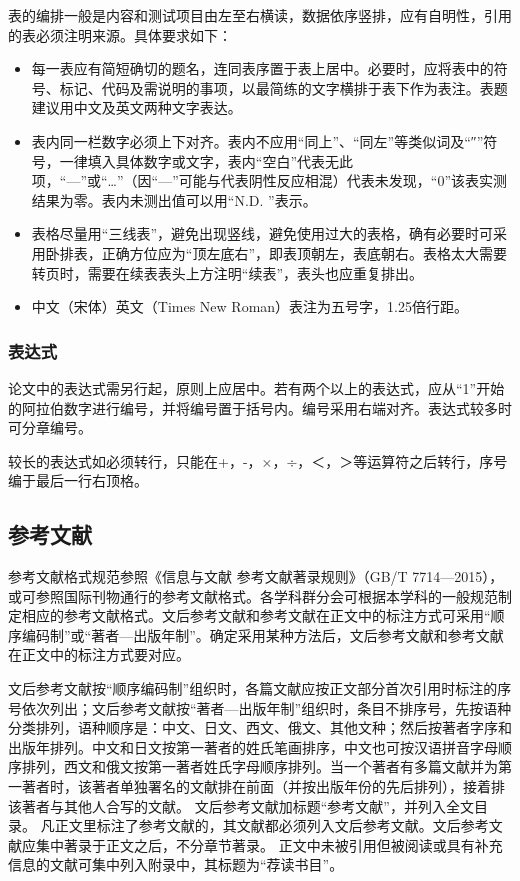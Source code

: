 {表的编排一般是内容和测试项目由左至右横读，数据依序竖排，应有自明性，引用的表必须注明来源。具体要求如下：
\begin{itemize}
    \item 每一表应有简短确切的题名，连同表序置于表上居中。必要时，应将表中的符号、标记、代码及需说明的事项，以最简练的文字横排于表下作为表注。表题建议用中文及英文两种文字表达。
    \item 表内同一栏数字必须上下对齐。表内不应用“同上”、“同左”等类似词及“″”符号，一律填入具体数字或文字，表内“空白”代表无此项，“—”或“…”（因“—”可能与代表阴性反应相混）代表未发现，“0”该表实测结果为零。表内未测出值可以用“N.D. ”表示。
    \item 表格尽量用“三线表”，避免出现竖线，避免使用过大的表格，确有必要时可采用卧排表，正确方位应为“顶左底右”，即表顶朝左，表底朝右。表格太大需要转页时，需要在续表表头上方注明“续表”，表头也应重复排出。
    \item 中文（宋体）英文（Times New Roman）表注为五号字，1.25倍行距。
\end{itemize}

\subsubsection{表达式}
论文中的表达式需另行起，原则上应居中。若有两个以上的表达式，应从“1”开始的阿拉伯数字进行编号，并将编号置于括号内。编号采用右端对齐。表达式较多时可分章编号。

较长的表达式如必须转行，只能在+，-，×，÷，＜，＞等运算符之后转行，序号编于最后一行右顶格。

\subsection{参考文献}
参考文献格式规范参照《信息与文献 参考文献著录规则》（GB/T 7714—2015），或可参照国际刊物通行的参考文献格式。各学科群分会可根据本学科的一般规范制定相应的参考文献格式。文后参考文献和参考文献在正文中的标注方式可采用“顺序编码制”或“著者—出版年制”。确定采用某种方法后，文后参考文献和参考文献在正文中的标注方式要对应。

文后参考文献按“顺序编码制”组织时，各篇文献应按正文部分首次引用时标注的序号依次列出；文后参考文献按“著者—出版年制”组织时，条目不排序号，先按语种分类排列，语种顺序是：中文、日文、西文、俄文、其他文种；然后按著者字序和出版年排列。中文和日文按第一著者的姓氏笔画排序，中文也可按汉语拼音字母顺序排列，西文和俄文按第一著者姓氏字母顺序排列。当一个著者有多篇文献并为第一著者时，该著者单独署名的文献排在前面（并按出版年份的先后排列），接着排该著者与其他人合写的文献。
文后参考文献加标题“参考文献”，并列入全文目录。
凡正文里标注了参考文献的，其文献都必须列入文后参考文献。文后参考文献应集中著录于正文之后，不分章节著录。
正文中未被引用但被阅读或具有补充信息的文献可集中列入附录中，其标题为“荐读书目”。

}
